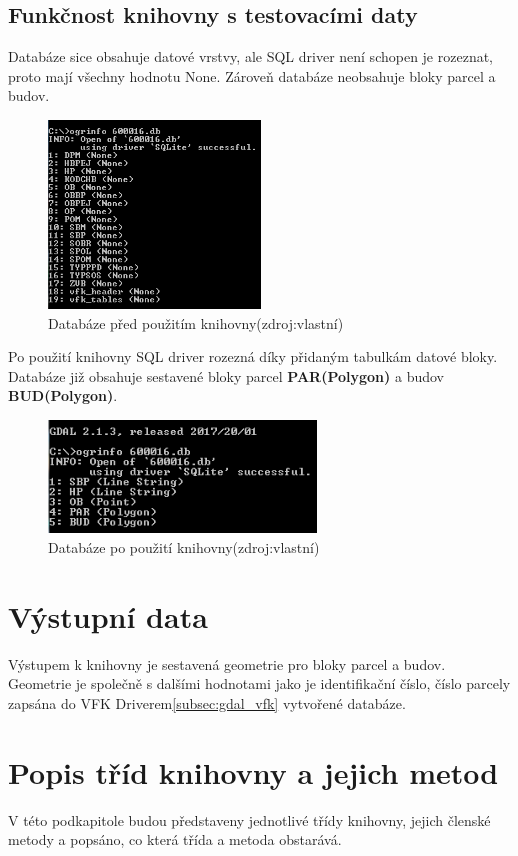 \subsection{Funkčnost knihovny s testovacími daty}
Databáze sice obsahuje datové vrstvy, ale SQL driver není schopen je rozeznat, proto mají všechny hodnotu None. Zároveň databáze neobsahuje bloky parcel a budov.
\begin{figure}[H]
	 \centering
      \includegraphics[height=5cm]{./pictures/funkcnost_knihovny_pred.png}
      \caption{Databáze před použitím knihovny(zdroj:vlastní)}
      \label{fig:funkcnost_pred}
\end{figure}
Po použití knihovny SQL driver rozezná díky přidaným tabulkám datové bloky. Databáze již obsahuje sestavené bloky parcel \textbf{PAR(Polygon)} a budov \textbf{BUD(Polygon)}. 
\begin{figure}[H]
	 \centering
     \includegraphics[height=3cm]{./pictures/funkcnost_knihovny_po.png}
     \caption{Databáze po použití knihovny(zdroj:vlastní)}
     \label{fig:funkcnost_po}
\end{figure}  
  
\section{Výstupní data}
Výstupem k knihovny je sestavená geometrie pro bloky parcel a budov. Geometrie je společně s dalšími hodnotami jako je identifikační číslo, číslo parcely zapsána do VFK Driverem\ref{subsec:gdal_vfk} vytvořené databáze.

\section{Popis tříd knihovny a jejich metod}
\label{sec:popis_trid}
V této podkapitole budou představeny jednotlivé třídy knihovny, jejich členské metody a popsáno, co která třída a metoda obstarává.

